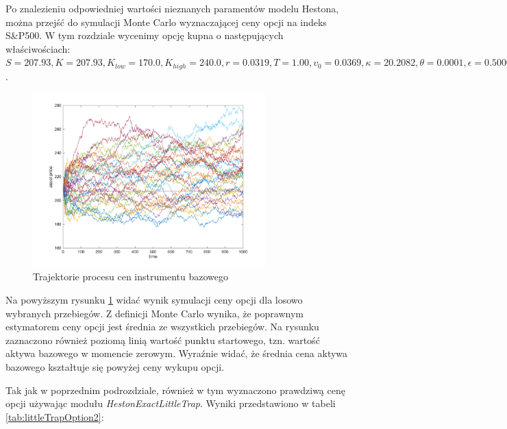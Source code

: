 \documentclass{pracamgr}
\begin{document}
Po znalezieniu odpowiedniej wartości nieznanych paramentów modelu Hestona, można 
przejść do symulacji Monte Carlo wyznaczającej ceny opcji na indeks S\&P500.
W tym rozdziale wycenimy opcję kupna o następujących właściwościach: 
   $S         = 207.93   
   ,K         = 207.93  
   ,K_{low}   = 170.0  
   ,K_{high}  = 240.0   
   ,r         = 0.0319  
   ,T         = 1.00   
   ,v_0       = 0.0369  
   ,\kappa    = 20.2082  
   ,\theta    = 0.0001  
   ,\epsilon  = 0.5000  
   ,\rho      = -0.90$.
\begin{figure}
\centering
  \includegraphics[width=0.80\textwidth]{../output/figures/chartHeston.png}
  \caption{Trajektorie procesu cen instrumentu bazowego}
  \label{fig:hestonAssetPaths}
\end{figure}

Na powyższym rysunku \ref{fig:hestonAssetPaths} widać wynik symulacji ceny opcji dla losowo wybranych przebiegów.
Z definicji Monte Carlo wynika, że poprawnym estymatorem ceny
opcji jest średnia ze wszystkich przebiegów.
Na rysunku zaznaczono również poziomą linią wartość punktu startowego, tzn. wartość 
aktywa bazowego w momencie zerowym. Wyraźnie widać, że średnia cena aktywa 
bazowego kształtuje się powyżej ceny wykupu opcji.

Tak jak w poprzednim podrozdziale, również w tym wyznaczono 
prawdziwą cenę opcji używając
modułu \textit{HestonExactLittleTrap}. Wyniki przedstawiono w tabeli
\ref{tab:littleTrapOption2}:
\end{document}
